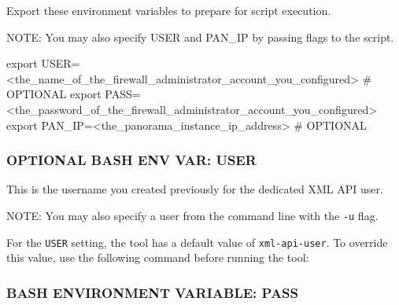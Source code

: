 \documentclass[
]{article}
\newenvironment{Shaded}{}{}
\newcommand{\BuiltInTok}[1]{#1}
\newcommand{\CommentTok}[1]{\textcolor[rgb]{0.38,0.63,0.69}{\textit{#1}}}
\newcommand{\ExtensionTok}[1]{#1}
\newcommand{\NormalTok}[1]{#1}
\newcommand{\OperatorTok}[1]{\textcolor[rgb]{0.40,0.40,0.40}{#1}}
\newcommand{\StringTok}[1]{\textcolor[rgb]{0.25,0.44,0.63}{#1}}
\newcommand{\VariableTok}[1]{\textcolor[rgb]{0.10,0.09,0.49}{#1}}
\begin{document}
Export these environment variables to prepare for script execution.

NOTE: You may also specify USER and PAN\_IP by passing flags to the
script.

\begin{Shaded}
\begin{Highlighting}[]
\BuiltInTok{export} \VariableTok{USER=}\OperatorTok{\textless{}}\ExtensionTok{the\_name\_of\_the\_firewall\_administrator\_account\_you\_configured}\OperatorTok{\textgreater{}}\NormalTok{ \# OPTIONAL}
\BuiltInTok{export} \VariableTok{PASS=}\OperatorTok{\textless{}}\ExtensionTok{the\_password\_of\_the\_firewall\_administrator\_account\_you\_configured}\OperatorTok{\textgreater{}}
\BuiltInTok{export} \VariableTok{PAN\_IP=}\OperatorTok{\textless{}}\ExtensionTok{the\_panorama\_instance\_ip\_address}\OperatorTok{\textgreater{}}\NormalTok{ \# OPTIONAL}
\end{Highlighting}
\end{Shaded}

\hypertarget{optional-bash-env-var-user}{%
\subsubsection{OPTIONAL BASH ENV VAR:
USER}\label{optional-bash-env-var-user}}

This is the username you created previously for the dedicated XML API
user.

NOTE: You may also specify a user from the command line with the
\texttt{-u} flag.

For the \texttt{USER} setting, the tool has a default value of
\texttt{xml-api-user}. To override this value, use the following command
before running the tool:

\begin{Shaded}
\end{Shaded}

\hypertarget{bash-environment-variable-pass}{%
\subsubsection{BASH ENVIRONMENT VARIABLE:
PASS}\label{bash-environment-variable-pass}}
\end{document}
